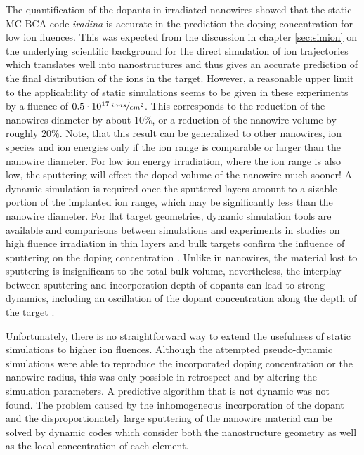 The quantification of the dopants in irradiated nanowires showed that the static MC BCA code \emph{iradina} is accurate in the prediction the doping concentration for low ion fluences. This was expected from the discussion in chapter \ref{sec:simion} on the underlying scientific background for the direct simulation of ion trajectories which translates well into nanostructures and thus gives an accurate prediction of the final distribution of the ions in the target. However, a reasonable upper limit to the applicability of static simulations seems to be given in these experiments by a fluence of $0.5\cdot 10^{17}\,\nicefrac{ions}{cm^2}$. This corresponds to the reduction of the nanowires diameter by about $10\%$, or a reduction of the nanowire volume by roughly $20\%$. Note, that this result can be generalized to other nanowires, ion species and ion energies only if the ion range is comparable or larger than the nanowire diameter. For low ion energy irradiation, where the ion range is also low, the sputtering will effect the doped volume of the nanowire much sooner! A dynamic simulation is required once the sputtered layers amount to a sizable portion of the implanted ion range, which may be significantly less than the nanowire diameter. For flat target geometries, dynamic simulation tools are available \cite{moller_tridyn_1984,moller_tridyn-binary_1988} and comparisons between simulations and experiments in studies on high fluence irradiation in thin layers and bulk targets confirm the influence of sputtering on the doping concentration \cite{miyagawa_computer_1991,sigmund_alloy_1993}. Unlike in nanowires, the material lost to sputtering is insignificant to the total bulk volume, nevertheless, the interplay between sputtering and incorporation depth of dopants can lead to strong dynamics, including an oscillation of the dopant concentration along the depth of the target \cite{eckstein_oscillations_2000}. 

Unfortunately, there is no straightforward way to extend the usefulness of static simulations to higher ion fluences. Although the attempted pseudo-dynamic simulations were able to reproduce the incorporated doping concentration or the nanowire radius, this was only possible in retrospect and by altering the simulation parameters. A predictive algorithm that is not dynamic was not found. The problem caused by the inhomogeneous incorporation of the dopant and the disproportionately large sputtering of the nanowire material can be solved by dynamic codes which consider both the nanostructure geometry as well as the local concentration of each element.

